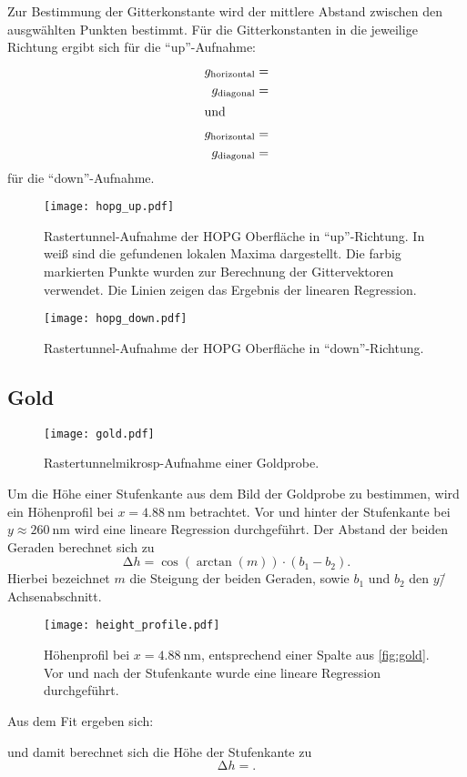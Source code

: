 Zur Bestimmung der Gitterkonstante wird der mittlere Abstand zwischen den ausgwählten Punkten bestimmt.
Für die Gitterkonstanten in die jeweilige Richtung ergibt sich für die \enquote{up}-Aufnahme:
\begin{align}
  g_\text{horizontal} &=  \\
  g_\text{diagonal} &=  \\
\shortintertext{und}
  g_\text{horizontal} &=  \\
  g_\text{diagonal} &= 
\end{align}
für die \enquote{down}-Aufnahme.

\begin{figure}
  \centering
  \texttt{[image: hopg\_up.pdf]}
  \caption{%
    Rastertunnel-Aufnahme der HOPG Oberfläche in \enquote{up}-Richtung.
    In weiß sind die gefundenen lokalen Maxima dargestellt. Die farbig markierten Punkte wurden zur Berechnung der Gittervektoren verwendet.
    Die Linien zeigen das Ergebnis der linearen Regression.
  }\label{fig:hopg_up}
\end{figure}

\begin{figure}
  \centering
  \texttt{[image: hopg\_down.pdf]}
  \caption{%
    Rastertunnel-Aufnahme der HOPG Oberfläche in \enquote{down}-Richtung.
  }\label{fig:hopg_down}
\end{figure}

\subsection{Gold}

\begin{figure}
  \centering
  \texttt{[image: gold.pdf]}
  \caption{Rastertunnelmikrosp-Aufnahme einer Goldprobe.}
  \label{fig:gold}
\end{figure}

Um die Höhe einer Stufenkante aus dem Bild der Goldprobe zu bestimmen, wird ein Höhenprofil bei $x=\SI{4.88}{\nano\meter}$ betrachtet.
Vor und hinter der Stufenkante bei  $y \approx \SI{260}{\nano\meter}$ wird eine lineare Regression durchgeführt.
Der Abstand der beiden Geraden berechnet sich zu
\begin{equation}
  \increment h = \cos(\arctan(m)) \cdot (b_1 - b_2).
\end{equation}
Hierbei bezeichnet $m$ die Steigung der beiden Geraden, sowie $b_1$ und $b_2$ den $y$\=/Achsenabschnitt.

\begin{figure}
  \centering
  \texttt{[image: height\_profile.pdf]}
  \caption{%
    Höhenprofil bei $x=\SI{4.88}{\nano\meter}$,
    entsprechend einer Spalte aus \autoref{fig:gold}.
    Vor und nach der Stufenkante wurde eine lineare Regression durchgeführt.}\label{fig:profile}
\end{figure}


Aus dem Fit ergeben sich:

und damit berechnet sich die Höhe der Stufenkante zu
\begin{equation}
  \increment h = .
\end{equation}
